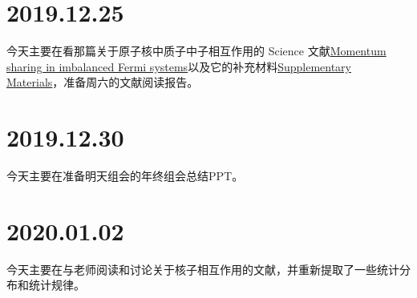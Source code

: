 \section{2019.12.25}
今天主要在看那篇关于原子核中质子中子相互作用的 Science 文献\href{https://science.sciencemag.org/content/346/6209/614}{Momentum sharing in imbalanced Fermi systems}以及它的补充材料\href{https://science.sciencemag.org/content/suppl/2014/10/15/science.1256785.DC1}{Supplementary Materials}，准备周六的文献阅读报告。

\section{2019.12.30}
今天主要在准备明天组会的年终组会总结PPT。

\section{2020.01.02}
今天主要在与老师阅读和讨论关于核子相互作用的文献，并重新提取了一些统计分布和统计规律。
\begin{figure}[H]
\centering
{}
\qquad
{}
\end{figure}

